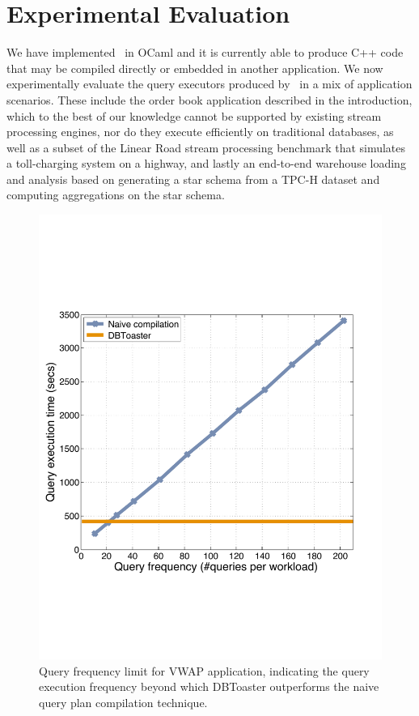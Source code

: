

\section{Experimental Evaluation}

We have implemented \compiler\ in OCaml and it is currently able to produce C++
code that may be compiled directly or embedded in another application. We now
experimentally evaluate the query executors produced by \compiler\ in a mix of
application scenarios. These include the order book application described in the
introduction, which to the best of our knowledge cannot be supported by existing
stream processing engines, nor do they execute efficiently on traditional
databases, as well as a subset of the Linear Road stream processing benchmark
that simulates a toll-charging system on a highway, and lastly an end-to-end
warehouse loading and analysis based on generating a star schema from a TPC-H
dataset and computing aggregations on the star schema.

\begin{figure}[tb]
\begin{center}
\includegraphics[scale=0.25]{../plots/vwap_query_freq_dn}
\end{center}
\vspace{-4mm}
\caption{Query frequency limit for VWAP application, indicating the
query execution frequency beyond which DBToaster outperforms the naive query
plan compilation technique.}
\label{fig:vwap_query_freq}
\end{figure}


